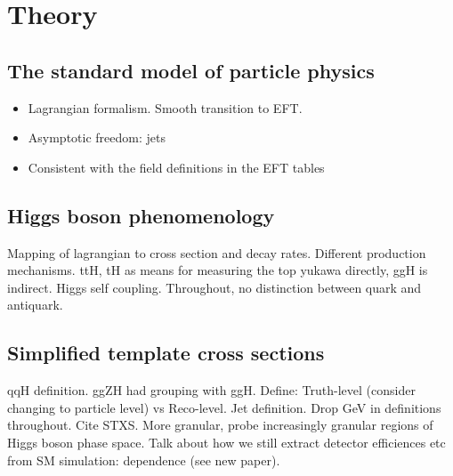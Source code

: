 \chapter{Theory}
\label{chap:theory}

\section{The standard model of particle physics}
\begin{itemize}
    \item Lagrangian formalism. Smooth transition to EFT.
    \item Asymptotic freedom: jets
    \item Consistent with the field definitions in the EFT tables
\end{itemize}

\section{Higgs boson phenomenology}
Mapping of lagrangian to cross section and decay rates.
Different production mechanisms. ttH, tH as means for measuring the top yukawa directly, ggH is indirect. Higgs self coupling. Throughout, no distinction between quark and antiquark.

\section{Simplified template cross sections}\label{sec:theory_stxs}
qqH definition. ggZH had grouping with ggH. Define: Truth-level (consider changing to particle level) vs Reco-level. Jet definition. Drop GeV in definitions throughout. Cite STXS. More granular, probe increasingly granular regions of Higgs boson phase space. Talk about how we still extract detector efficiences etc from SM simulation: dependence (see new paper).

